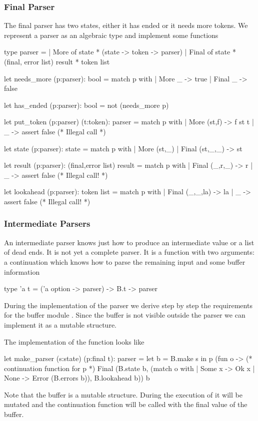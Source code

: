 \subsubsection{Final Parser}
The final parser has two states, either it has ended or it needs more
tokens. We represent a parser as an algebraic type and implement some
functions
%
\begin{ocaml}
  type parser =
  | More  of state * (state -> token -> parser)
  | Final of state * (final, error list) result * token list

  let needs_more (p:parser): bool =
    match p with
    | More _ -> true | Final _ -> false

  let has_ended (p:parser): bool = not (needs_more p)

  let put_token (p:parser) (t:token): parser =
    match p with
    | More (st,f) ->
        f st t
    | _ ->
      assert false (* Illegal call *)

  let state (p:parser): state =
    match p with
    | More (st,_) | Final (st,_,_) -> st

  let result (p:parser): (final,error list) result =
    match p with
    | Final (_,r,_) -> r
    | _ -> assert false (* Illegal call! *)

  let lookahead (p:parser): token list =
    match p with
    | Final (_,_,la) -> la
    | _ -> assert false (* Illegal call! *)
\end{ocaml}
%


\subsubsection{Intermediate Parsers}
An intermediate parser knows just how to produce an intermediate value or a
list of dead ends. It is not yet a complete parser. It is a function with two
arguments: a continuation which knows how to parse the remaining input and
some buffer information
%
\begin{ocaml}
  type 'a t = ('a option -> parser) -> B.t -> parser
\end{ocaml}
%

During the implementation of the parser we derive step by step the
requirements for the buffer module . Since the buffer is not visible
outside the parser we can implement it as a mutable structure.

The implementation of the function  looks like
\begin{ocaml}
  let make_parser (s:state) (p:final t): parser =
    let b = B.make s in
    p (fun o ->  (* continuation function for p *)
         Final (B.state b,
                (match o with
                 | Some x -> Ok x
                 | None   -> Error (B.errors b)),
                B.lookahead b))
      b
\end{ocaml}
%
Note that the buffer is a mutable structure. During the execution of 
it will be mutated and the continuation function will be called with the final
value of the buffer.



